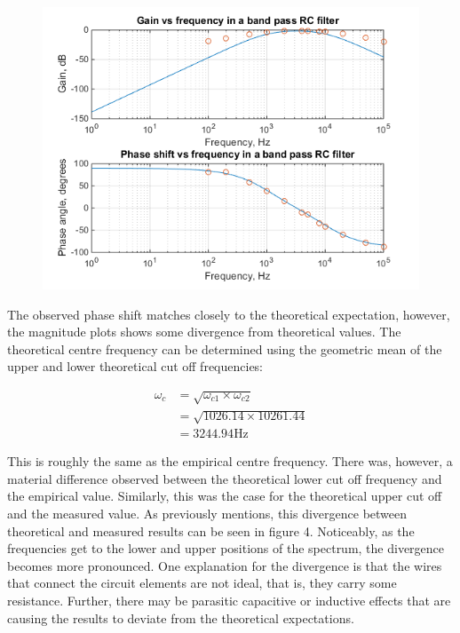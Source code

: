 \documentclass{article}
\begin{document}
\begin{center}
	\begin{figure}[H]
		\begin{minipage}{0.6\textwidth}
			\includegraphics[scale=0.8]{bode2}
		\end{minipage}
	\end{figure}
\end{center}

The observed phase shift matches closely to the theoretical expectation, however, the magnitude plots shows some divergence from theoretical values. The theoretical centre frequency can be determined using the geometric mean of the upper and lower theoretical cut off frequencies:

\begin{align*}
	\omega_c &= \sqrt{\omega_{c1} \times \omega_{c2}} \\
	&= \sqrt{1026.14 \times 10261.44} \\
	&= 3244.94 \si{\hertz}
\end{align*}

This is roughly the same as the empirical centre frequency. There was, however, a material difference observed between the theoretical lower cut off frequency and the empirical value. Similarly, this was the case for the theoretical upper cut off and the measured value. As previously mentions, this divergence between theoretical and measured results can be seen in figure 4. Noticeably, as the frequencies get to the lower and upper positions of the spectrum, the divergence becomes more pronounced. One explanation for the divergence is that the wires that connect the circuit elements are not ideal, that is, they carry some resistance. Further, there may be parasitic capacitive or inductive effects that are causing the results to deviate from the theoretical expectations.



\end{document}
